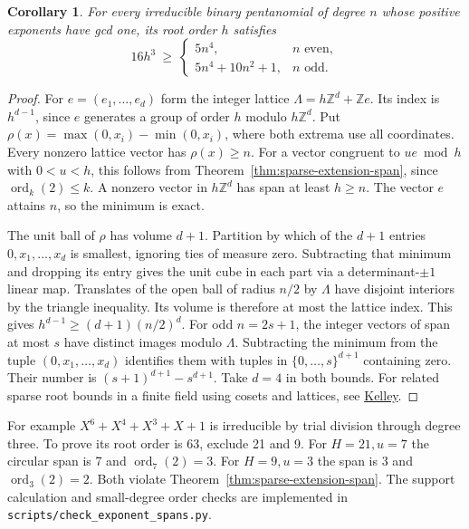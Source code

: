 \documentclass[11pt]{article}
\newtheorem{corollary}[theorem]{Corollary}
\newcommand{\ord}{\operatorname{ord}}
\begin{document}
\begin{corollary}\label{cor:pentanomial-packing}
For every irreducible binary pentanomial of degree \(n\) whose positive
exponents have gcd one, its root order \(h\) satisfies
\[
 16h^3\ \ge\
 \begin{cases}
      5n^4,& n\text{ even},\\
      5n^4+10n^2+1,& n\text{ odd}.
 \end{cases}
\]
\end{corollary}
\begin{proof}
For \(e=(e_1,\ldots,e_d)\) form the integer lattice
\(\Lambda=h\mathbb Z^d+\mathbb Z e\). Its index is \(h^{d-1}\),
since \(e\) generates a group of order \(h\) modulo \(h\mathbb Z^d\).
Put \(\rho(x)=\max(0,x_i)-\min(0,x_i)\), where both extrema use all coordinates.
Every nonzero lattice vector has \(\rho(x)\ge n\). For a vector congruent
to \(ue\bmod h\) with \(0<u<h\), this follows from
Theorem~\ref{thm:sparse-extension-span}, since \(\ord_k(2)\le k\).
A nonzero vector in \(h\mathbb Z^d\) has span at least \(h\ge n\).
The vector \(e\) attains \(n\), so the minimum is exact.

The unit ball of \(\rho\) has volume \(d+1\). Partition by which of
the \(d+1\) entries \(0,x_1,\ldots,x_d\) is smallest, ignoring ties
of measure zero. Subtracting that minimum and dropping its entry
gives the unit cube in each part via a determinant-\(\pm1\) linear map.
Translates of the open ball of radius \(n/2\) by \(\Lambda\) have
disjoint interiors by the triangle inequality. Its volume is therefore
at most the lattice index. This gives \(h^{d-1}\ge(d+1)(n/2)^d\).
For odd \(n=2s+1\), the integer vectors of span at most \(s\) have
distinct images modulo \(\Lambda\). Subtracting the minimum from the
tuple \((0,x_1,\ldots,x_d)\) identifies them with tuples in
\(\{0,\ldots,s\}^{d+1}\) containing zero. Their number is
\((s+1)^{d+1}-s^{d+1}\). Take \(d=4\) in both bounds.
For related sparse root bounds in a finite field using cosets and
lattices, see \href{https://doi.org/10.1112/S1461157016000334}{Kelley}.
\end{proof}

For example \(X^6+X^4+X^3+X+1\) is irreducible by trial division
through degree three. To prove its root order is 63, exclude 21 and 9.
For \(H=21,u=7\) the circular span is 7 and \(\ord_7(2)=3\).
For \(H=9,u=3\) the span is 3 and \(\ord_3(2)=2\).
Both violate Theorem~\ref{thm:sparse-extension-span}.
The support calculation and small-degree order checks are implemented in
\nolinkurl{scripts/check_exponent_spans.py}.
\end{document}
